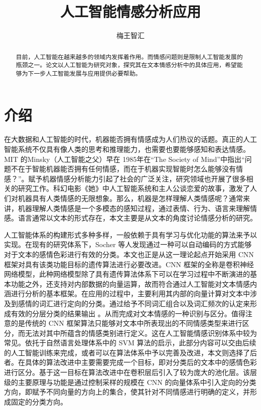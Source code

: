 \documentclass[lang=cn,11pt,a4paper,twocolumn]{elegantpaper}
\title{人工智能情感分析应用}
\author{梅王智汇}
\date{}
\begin{document}
\maketitle
\thispagestyle{fancy}         %
\fancyhead{}                     %
\lfoot{}
\cfoot{\thepage}  %
\rfoot{}
\renewcommand{\headrulewidth}{0pt}      %
\renewcommand{\footrulewidth}{0pt}

\begin{abstract}
目前，人工智能在越来越多的领域内发挥着作用。而情感问题则是限制人工智能发展的瓶颈之一。论文以人工智能为研究对象，探究其在文本情感分析中的具体应用，希望能够为下一步人工智能发展与应用提供必要帮助。
\end{abstract}

\section{介绍}
在大数据和人工智能的时代，机器能否拥有情感成为人们热议的话题。真正的人工智能系统不仅具有像人类的思考和推理能力，也需要也要能够感知和表达情感。MIT 的Minsky（人工智能之父）早在 1985年在“The Society of Mind”中指出“问题不在于智能机器能否拥有任何情感，而在于机器实现智能时怎么能够没有情感？”。赋予机器情感分析能力引起了社会的广泛关注，研究领域也开展了很多相关的研究工作。科幻电影《她》中人工智能系统和主人公谈恋爱的故事，激发了人们对机器具有人类情感的无限想象。那么，机器是怎样理解人类情感呢？通常来讲，机器理解人类情感是一个多模态的感知过程，通过表情、行为、语言来理解情感。语言通常以文本的形式存在，本文主要是从文本的角度讨论情感分析的研究。

人工智能体系的构建形式多种多样，一般依赖于具有学习与优化功能的算法来予以实现。在现有的研究体系下，Socher 等人发现通过一种可以自动编码的方式能够对于文本的感情色彩进行有效的分类。本文也正是从这一理论起点开始采用 CNN 框架对具有该类功能目标的遗传算法进行必要改进。CNN 框架的全称是卷积神经网络模型，此种网络模型除了具有遗传算法体系下可以在学习过程中不断演进的基本功能之外，还支持对内部数据的向量运算，故而符合通过人工智能对文本情感内涵进行分析的基本框架。在应用的过程中，主要利用其内部的向量计算对文本中涉及到感情的词汇进行定向的分类。通过给予不同词汇组合以及词汇频次的认定来形成有效的分层分类的结果输出 。从而完成对文本情感的一种识别与区分。值得注意的是传统的 CNN 框架算法只能够对文本中所表现出的不同情感类型来进行区分，而无法对其中所蕴含的情感类别进行定义。这在人工智能情感识别体系中较为常见。依托于自然语言处理体系中的 SVM 算法的启示，此部分内容可以交由后续的人工智能训练来完成，或者可以在算法体系中予以完善及改进，本文则选择了后者。在具体的算法改进中主要需要完成一个目标，即对分类后的文本中的感情色彩进行区分。基于这一目标在算法改进中在卷积层后引入了较为庞大的池化层。该层级的主要原理与功能是通过控制采样的规模在 CNN 的向量体系中引入定向的分类方向，即赋予不同向量的方向上的集合，使其针对不同情感进行明确的定义，并形成固定的分类方向。
\end{document}

